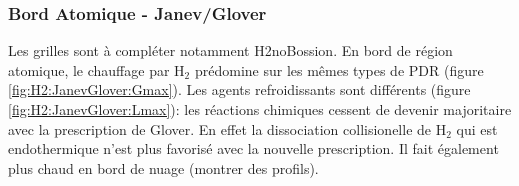 
\subsubsection{Bord Atomique - Janev/Glover}

Les grilles sont à compléter notamment H2noBossion. En bord de région atomique, le chauffage par $\mathrm{H}_2$ prédomine sur les mêmes types de PDR (figure \ref{fig:H2:JanevGlover:Gmax}). Les agents refroidissants sont différents (figure \ref{fig:H2:JanevGlover:Lmax}): les réactions chimiques cessent de devenir majoritaire avec la prescription de Glover. En effet la dissociation collisionelle de $\mathrm{H}_2$ qui est endothermique n'est plus favorisé avec la nouvelle prescription. Il fait également plus chaud en bord de nuage (montrer des profils).

